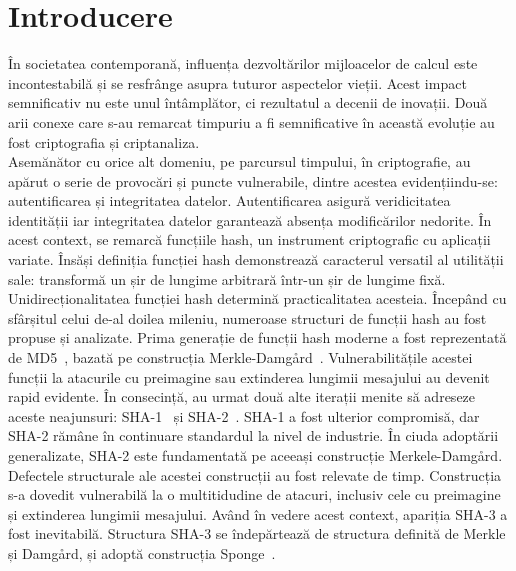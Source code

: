 \section{Introducere}

În societatea contemporană, influența dezvoltărilor mijloacelor de calcul este incontestabilă și se resfrânge asupra tuturor aspectelor vieții.
Acest impact semnificativ nu este unul întâmplător, ci rezultatul a decenii de inovații.
Două arii conexe care s-au remarcat timpuriu a fi semnificative în această evoluție au fost criptografia și criptanaliza. \\

Asemănător cu orice alt domeniu, pe parcursul timpului, în criptografie, au apărut o serie de provocări și puncte vulnerabile, dintre acestea evidențiindu-se: autentificarea și integritatea datelor.
Autentificarea asigură veridicitatea identității iar integritatea datelor garantează absența modificărilor nedorite.
În acest context, se remarcă funcțiile hash, un instrument criptografic cu aplicații variate.
Însăși definiția funcției hash demonstrează caracterul versatil al utilității sale: transformă un șir de lungime arbitrară într-un șir de lungime fixă.
Unidirecționalitatea funcției hash determină practicalitatea acesteia.
Începând cu sfârșitul celui de-al doilea mileniu, numeroase structuri de funcții hash au fost propuse și analizate.
Prima generație de funcții hash moderne a fost reprezentată de MD5~\cite{rivest1992md5}, bazată pe construcția Merkle-Damgård~\cite{merkle1989,damgard1989}.
Vulnerabilitățile acestei funcții la atacurile cu preimagine sau extinderea lungimii mesajului au devenit rapid evidente.
În consecință, au urmat două alte iterații menite să adreseze aceste neajunsuri: SHA-1~\cite{nist1995sha1} și SHA-2~\cite{nist2015sha2}.
SHA-1 a fost ulterior compromisă, dar SHA-2 rămâne în continuare standardul la nivel de industrie.
În ciuda adoptării generalizate, SHA-2 este fundamentată pe aceeași construcție Merkele-Damgård.
Defectele structurale ale acestei construcții au fost relevate de timp.
Construcția s-a dovedit vulnerabilă la o multitidudine de atacuri, inclusiv cele cu preimagine și extinderea lungimii mesajului.
Având în vedere acest context, apariția SHA-3 a fost inevitabilă.
Structura SHA-3 se îndepărtează de structura definită de Merkle și Damgård, și adoptă construcția Sponge~\cite{bertoni2007sponge}. \\

